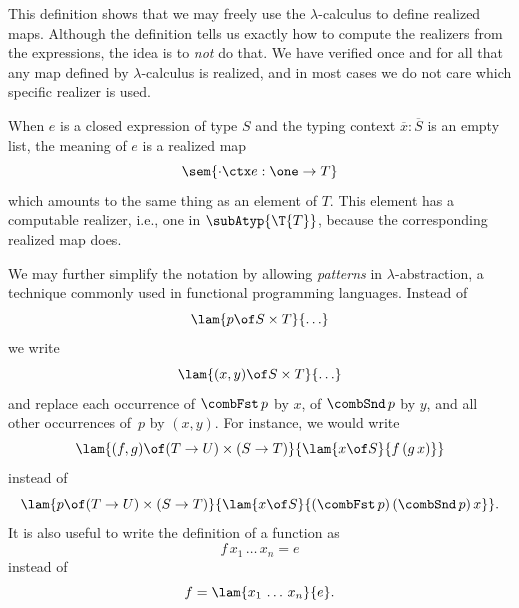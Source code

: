%
This definition shows that we may freely use the $\lambda$-calculus to
define realized maps. Although the definition tells us exactly how to
compute the realizers from the expressions, the idea is to \emph{not}
do that. We have verified once and for all that any map defined by
$\lambda$-calculus is realized, and in most cases we do not care which
specific realizer is used.

When $e$ is a closed expression of type $S$ and the typing
context $\overline{x} : \overline{S}$ is an empty list, the
meaning of $e$ is a realized map
%
\begin{equation*}
  \sem{{\cdot} \ctx e : \one \to T}
\end{equation*}
%
which amounts to the same thing as an element of $T$. This
element has a computable realizer, i.e., one in $\subAtyp{\T{T}}$,
because the corresponding realized map does.

We may further simplify the notation by allowing \emph{patterns} in
$\lambda$-abstraction, a technique commonly used in functional
programming languages. Instead of
%
\begin{equation*}
  \lam{p \of S \times T}{\ldots}
\end{equation*}
%
we write
%
\begin{equation*}
  \lam{(x,y) \of S \times T}{\ldots}
\end{equation*}
%
and replace each occurrence of $\combFst\,p$ by $x$, of $\combSnd\,p$
by $y$, and all other occurrences of~$p$ by $(x,y)$. For instance, we
would write
%
\begin{equation*}
  \lam{(f,g) \of (T \to U) \times (S \to T)}{
    \lam{x \of S}{f\,(g\,x)}}
\end{equation*}
%
instead of
%
\begin{equation*}
  \lam{p \of (T \to U) \times (S \to T)}{
    \lam{x \of S}{(\combFst\,p)\,(\combSnd\,p)\,x}}.
\end{equation*}
%
It is also useful to write the definition of a function as
%
\begin{equation*}
  f\,x_1\,\ldots\, x_n = e
\end{equation*}
%
instead of
%
\begin{equation*}
  f = \lam{x_1\,\ldots\, x_n}{e}.
\end{equation*}

